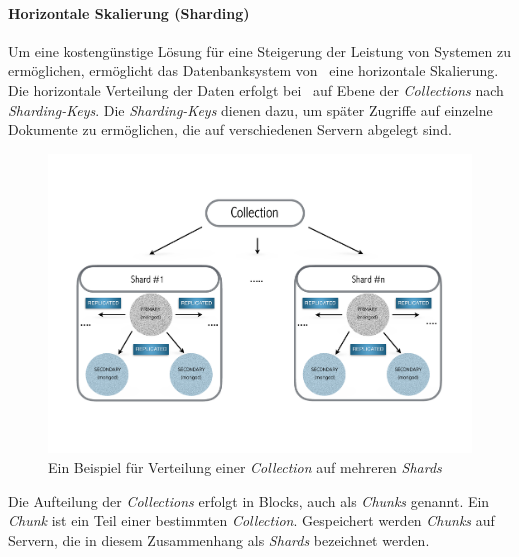 \paragraph{Horizontale Skalierung (Sharding)}\label{sharding}

Um eine kostengünstige Lösung für eine Steigerung der Leistung von Systemen zu ermöglichen, ermöglicht das Datenbanksystem von \mongo\  eine horizontale Skalierung. Die horizontale Verteilung der Daten erfolgt bei \mongo\ auf Ebene der \textit{Collections} nach \textit{Sharding-Keys}. Die \textit{Sharding-Keys} dienen dazu, um später Zugriffe auf einzelne Dokumente zu ermöglichen, die auf verschiedenen Servern abgelegt sind.
\begin{figure}[H]
\centering
\includegraphics[trim = 0mm 35mm 0mm 30mm, clip, width=1.0\textwidth]{resources/replicaSet/sharding}
\caption[Ein Beispiel für Verteilung einer \textit{Collection} auf mehreren \textit{Shards}]{Ein Beispiel für Verteilung einer \textit{Collection} auf mehreren \textit{Shards}}
\label{img:sharding}
\end{figure}
Die Aufteilung der \textit{Collections} erfolgt in Blocks, auch als \textit{Chunks} genannt. Ein \textit{Chunk} ist ein Teil einer bestimmten \textit{Collection}. Gespeichert werden \textit{Chunks} auf Servern, die in diesem Zusammenhang als \textit{Shards} bezeichnet werden.

